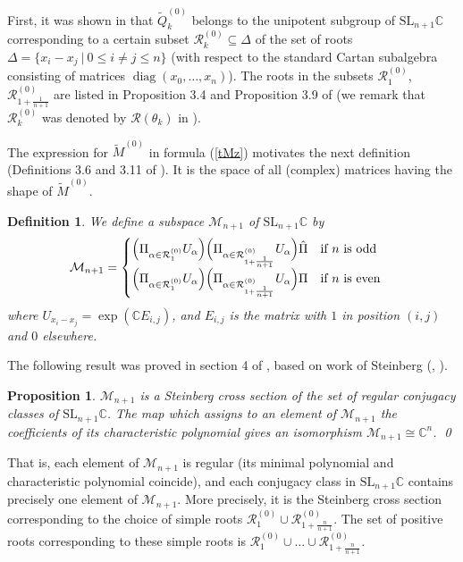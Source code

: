 \documentclass[a4paper,12pt,leqno]{amsart}
\numberwithin{equation}{section}
\theoremstyle{plain}
\newtheorem{proposition}[theorem]{Proposition}
\newtheorem{definition}[theorem]{Definition}
\theoremstyle{definition}
\newcommand{\C}{\mathbb C}
\newcommand{\al}{\alpha}
\newcommand{\De}{\Delta}
\renewcommand{\th}{\theta}
\DeclareMathOperator{\diag}{diag}
\newcommand{\SL}{\textrm{SL}}
\newcommand{\cR}{\mathcal{R}}
\newcommand{\cM}{\mathcal{M}}
\newcommand{\sub}{\subseteq}
\newcommand{\st}{\ \vert\ }
\newcommand{\tQz}{  \tilde Q^{(0)}  }
\newcommand{\tMz}{  \tilde M^{(0)}  }
\newcommand{\cRz}{ \cR^{(0)}}
\begin{document}
First, it was shown in \cite{GH1} that $\tQz_k$ belongs to the unipotent subgroup of $\SL_{n+1}\C$ corresponding to a certain subset $\cRz_k\sub \De$ of the set of roots
$\De=\{ x_i-x_j\st 0\le i\ne j \le n \}$ (with respect to the standard Cartan subalgebra
consisting of matrices $\diag(x_0,\dots,x_n)$).  The roots in the subsets
$\cRz_1$, $\cRz_{1+\scriptstyle\frac1{n+1}}$
are listed in Proposition 3.4 and Proposition 3.9 of \cite{GH1} (we remark that
$\cRz_{k}$ was denoted by
$\cR  (\th_{k})$
in  \cite{GH1}).

The expression for $\tMz$ in formula (\ref{tMz}) motivates the next definition (Definitions 3.6 and 3.11 of \cite{GH1}). It is the space of all (complex) matrices having the shape of $\tMz$.

\begin{definition}\label{scriptM}
We define a subspace $\cM_{n+1}$ of $\SL_{n+1}\C$ by
\[
\cM_{n+1}=
\begin{cases}
\Bigl(
\Pi_{\al\in\cRz_1} U_\al
\Bigr)
\Bigl(
\Pi_{\al\in\cRz_{1+\scriptstyle\frac 1{n+1}}} U_\al
\Bigr)
\hat\Pi \quad\text{if $n$ is odd}
\\
\Bigl(
\Pi_{\al\in\cRz_1} U_\al
\Bigr)
\Bigl(
\Pi_{\al\in\cRz_{1+\scriptstyle\frac 1{n+1}}} U_\al
\Bigr)
\Pi \quad\text{if $n$ is even}
\end{cases}
\]
where $U_{x_i-x_j}= \exp(\C E_{i,j})$,
and $E_{i,j}$ is the matrix with $1$ in position $(i,j)$ and $0$ elsewhere.
\end{definition}

The following result was proved in section 4 of \cite{GH1},
based on work of Steinberg (\cite{St65}, \cite{St74}).

\begin{proposition}\label{stein}
$\cM_{n+1}$ is a Steinberg
cross section of the set of regular conjugacy classes of $\SL_{n+1}\C$.
The map which assigns to an element of $\cM_{n+1}$ the coefficients of
its characteristic polynomial
gives an isomorphism $\cM_{n+1}\cong \C^n$.
\qed
\end{proposition}

That is, each element of $\cM_{n+1}$ is regular (its minimal polynomial and characteristic polynomial coincide), and each conjugacy class in $\SL_{n+1}\C$ contains precisely one element of $\cM_{n+1}$.
More
precisely, it is the  Steinberg
cross section corresponding to the choice of simple roots
$\cRz_1\cup \cRz_{1+\scriptstyle\frac n{n+1}}$.  The  set of positive roots corresponding to these simple roots
is $\cRz_1\cup \dots\cup \cRz_{1+\scriptstyle\frac n{n+1}}$.
\end{document}
